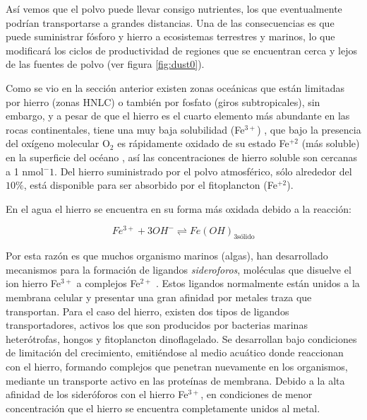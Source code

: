 Así vemos que el polvo puede llevar consigo nutrientes, los que eventualmente podrían transportarse a grandes distancias. Una de las consecuencias es que puede suministrar fósforo y hierro a ecosistemas terrestres y marinos, lo que modificará los ciclos de productividad de regiones que se encuentran cerca y lejos de las fuentes de polvo \citep{martin1990glacial,anderson2002southern,lambert2015dust,bopp2003dust} (ver figura \ref{fig:dust0}). 

Como se vio en la sección anterior existen zonas oceánicas que están limitadas por hierro (zonas HNLC) o también por fosfato  (giros subtropicales), sin embargo, y a pesar de que el hierro es el cuarto elemento más abundante en las rocas continentales, tiene una muy baja solubilidad (Fe$^{3+}$) \citep{archer2000caused}, que bajo la presencia del oxígeno molecular O$_2$ es rápidamente oxidado de su estado Fe$^{+2}$ (más soluble) en la superficie del océano \citep{martin1990glacial}, así las concentraciones de hierro soluble son cercanas a 1 nmol$^-1$. Del hierro suministrado por el polvo atmosférico, sólo alrededor del $10\%$, está disponible para ser absorbido por el fitoplancton (Fe$^{+2}$). 

En el agua el hierro se encuentra en su forma más oxidada debido a la reacción: 

\begin{equation} \label{eq:marco2.1}
Fe^{3+} + 3OH^{-} \rightleftharpoons Fe(OH)_{3 \textrm{sólido}}
\end{equation}

Por esta razón es que muchos organismo marinos (algas), han desarrollado 
mecanismos para la formación de ligandos \textit{sideroforos}, moléculas que disuelve el ion hierro Fe$^{3+}$ a complejos Fe$^{2+}$ \citep{martin1990glacial,tagliabue2017integral}. Estos ligandos normalmente están unidos a la membrana celular y presentar una gran afinidad por metales traza que transportan. Para el caso del hierro, existen dos tipos de ligandos transportadores, activos los que son producidos por bacterias marinas heterótrofas, hongos y fitoplancton dinoflagelado. Se desarrollan bajo condiciones de limitación del crecimiento, emitiéndose al medio acuático donde reaccionan con el hierro, formando complejos que penetran nuevamente en los organismos, mediante un transporte activo en las proteínas de membrana.
Debido a la alta afinidad de los sideróforos con el hierro Fe$^{3+}$, en condiciones de menor concentración que el hierro se encuentra completamente unidos al metal. 

